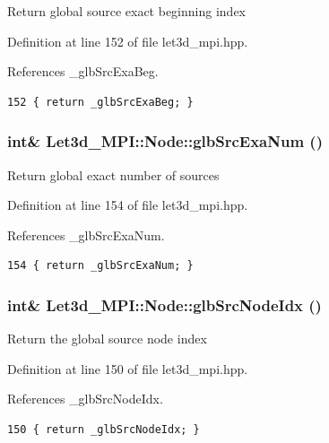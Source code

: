 Return global source exact beginning index 

Definition at line 152 of file let3d\_\-mpi.hpp.

References \_\-glb\-Src\-Exa\-Beg.

\footnotesize\begin{verbatim}152 { return _glbSrcExaBeg; }
\end{verbatim}\normalsize 


\subsubsection{\setlength{\rightskip}{0pt plus 5cm}int\& Let3d\_\-MPI::Node::glb\-Src\-Exa\-Num ()\hspace{0.3cm}{\tt  [inline]}}\label{classLet3d__MPI_1_1Node_aec516069f69a725ee2b5eef0316c7fa_aec516069f69a725ee2b5eef0316c7fa}


Return global exact number of sources 

Definition at line 154 of file let3d\_\-mpi.hpp.

References \_\-glb\-Src\-Exa\-Num.

\footnotesize\begin{verbatim}154 { return _glbSrcExaNum; }
\end{verbatim}\normalsize 


\subsubsection{\setlength{\rightskip}{0pt plus 5cm}int\& Let3d\_\-MPI::Node::glb\-Src\-Node\-Idx ()\hspace{0.3cm}{\tt  [inline]}}\label{classLet3d__MPI_1_1Node_ed4d3109da13f01af00e169b3da0e385_ed4d3109da13f01af00e169b3da0e385}


Return the global source node index 

Definition at line 150 of file let3d\_\-mpi.hpp.

References \_\-glb\-Src\-Node\-Idx.

\footnotesize\begin{verbatim}150 { return _glbSrcNodeIdx; }
\end{verbatim}\normalsize 


